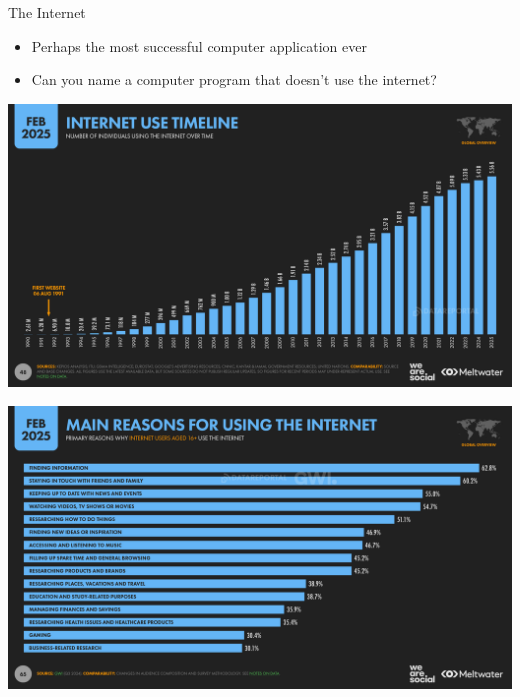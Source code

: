
\begin{frame}{The Internet}
    \begin{itemize}
    \item Perhaps the most successful computer application ever
    \item Can you name a computer program that doesn't use the internet?
    \end{itemize}
\end{frame}

\begin{frame}{}
\begin{center}
\includegraphics[width=0.8\pagewidth]{../network/internet_users.png}
\end{center}
\end{frame}

\begin{frame}{}
\begin{center}
\includegraphics[width=0.8\pagewidth]{../network/internet_reasons.png}
\end{center}
\end{frame}


